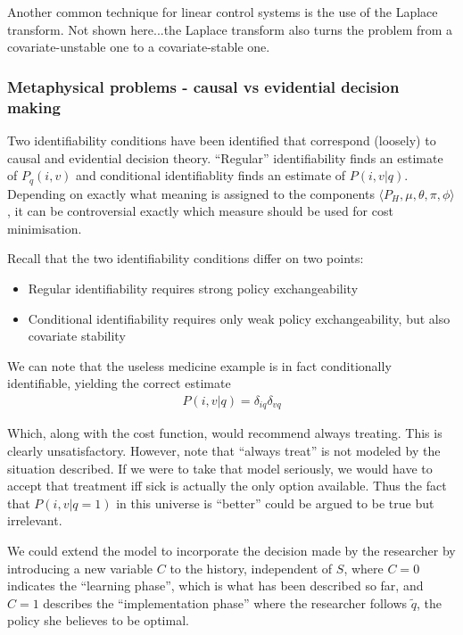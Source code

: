 Another common technique for linear control systems is the use of the Laplace transform. Not shown here...the Laplace transform also turns the problem from a covariate-unstable one to a covariate-stable one.

\subsubsection{Metaphysical problems - causal vs evidential decision making}

Two identifiability conditions have been identified that correspond (loosely) to causal and evidential decision theory. ``Regular'' identifiability finds an estimate of $P_q(i,v)$ and conditional identifiablity finds an estimate of $P(i,v|q)$. Depending on exactly what meaning is assigned to the components $\langle P_H, \mu, \theta, \pi, \phi\rangle$, it can be controversial exactly which measure should be used for cost minimisation.

Recall that the two identifiability conditions differ on two points:
\begin{itemize}
    \item Regular identifiability requires strong policy exchangeability
    \item Conditional identifiability requires only weak policy exchangeability, but also covariate stability
\end{itemize}

We can note that the useless medicine example is in fact conditionally identifiable, yielding the correct estimate
\begin{align}
    P(i,v|q) = \delta_{iq} \delta_{vq}
\end{align}

Which, along with the cost function, would recommend always treating. This is clearly unsatisfactory. However, note that ``always treat'' is not modeled by the situation described. If we were to take that model seriously, we would have to accept that treatment iff sick is actually the only option available. Thus the fact that $P(i,v|q=1)$ in this universe is ``better'' could be argued to be true but irrelevant.

We could extend the model to incorporate the decision made by the researcher by introducing a new variable $C$ to the history, independent of $S$, where $C=0$ indicates the ``learning phase'', which is what has been described so far, and $C=1$ describes the ``implementation phase'' where the researcher follows $\tilde{q}$, the policy she believes to be optimal.

